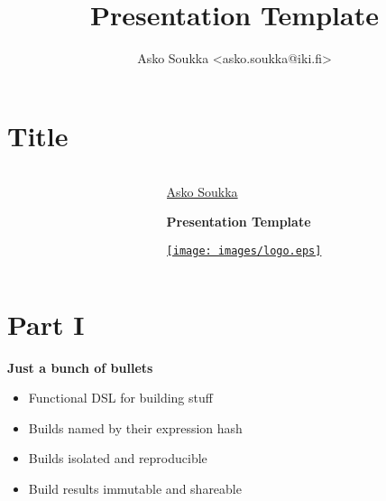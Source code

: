 \documentclass[aspectratio=169]{beamer}
\title{Presentation Template}
\author{Asko Soukka <asko.soukka@iki.fi>}
\begin{document}
\section{Title}

{
\begin{frame}[plain,t]
  \begin{columns}[onlytextwidth]
    \begin{column}{0.45\textwidth}
    \end{column}
    \begin{column}{0.45\textwidth}
      \vspace{1.0cm}
      \par
      \centering
      \href{https://iki.fi/asko.soukka/}{Asko Soukka}
      \vspace{1.0cm}
      \par
      \Huge
      \bfseries
      Presentation Template
      \par
      \large
      \mdseries
      \vspace{1.0cm}\par
      \href{https://www.jyu.fi/}{\texttt{[image: images/logo.eps]}}
    \end{column}
  \end{columns}
\end{frame}
}

\section{Part I}

{
%
\begin{frame}[plain,t]
  \vfill
  \centering
  \Huge
  \bfseries
  \lsstyle
\end{frame}
}

\begin{frame}[plain,t]
  \vspace{1.0cm}\par
  \Huge
  \bfseries
  \centering Just a bunch of bullets
  \huge
  \vspace{1.0cm}\par
  \mdseries
  \begin{itemize}[label=--]
    \item Functional DSL for building stuff
    \item Builds named by their expression hash
    \item Builds isolated and reproducible
    \item Build results immutable and shareable
  \end{itemize}
\end{frame}
\end{document}
